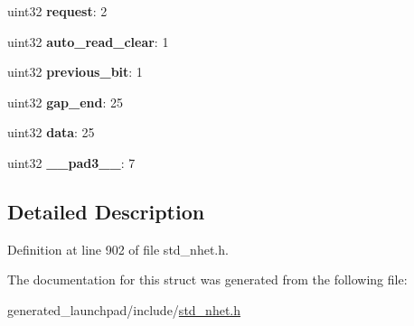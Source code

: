 \begin{DoxyCompactItemize}
\item 
\mbox{\label{structacnt__format_a248f30e11a0abdd02d07a3b18dd88fc3}} 
uint32 {\bfseries request}\+: 2
\item 
\mbox{\label{structacnt__format_ae5678a8724b623e96239bf9d99caa4fa}} 
uint32 {\bfseries auto\+\_\+read\+\_\+clear}\+: 1
\item 
\mbox{\label{structacnt__format_ae31d324d897d5ac4849dc1cb78cfa014}} 
uint32 {\bfseries previous\+\_\+bit}\+: 1
\item 
\mbox{\label{structacnt__format_a4241f8cc12d6194fc35be4d97295e653}} 
uint32 {\bfseries gap\+\_\+end}\+: 25
\item 
\mbox{\label{structacnt__format_a1173496c5f23ece635fe41b35864a466}} 
uint32 {\bfseries data}\+: 25
\item 
\mbox{\label{structacnt__format_a1d426616f38341fb4ecc21cd755d3379}} 
uint32 {\bfseries \+\_\+\+\_\+pad3\+\_\+\+\_\+}\+: 7
\end{DoxyCompactItemize}


\subsection{Detailed Description}


Definition at line 902 of file std\+\_\+nhet.\+h.



The documentation for this struct was generated from the following file\+:\begin{DoxyCompactItemize}
\item 
generated\+\_\+launchpad/include/\mbox{\hyperlink{std__nhet_8h}{std\+\_\+nhet.\+h}}\end{DoxyCompactItemize}
